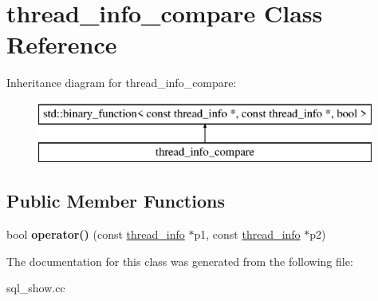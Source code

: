 \hypertarget{classthread__info__compare}{}\section{thread\+\_\+info\+\_\+compare Class Reference}
\label{classthread__info__compare}
Inheritance diagram for thread\+\_\+info\+\_\+compare\+:\begin{figure}[H]
\begin{center}
\leavevmode
\includegraphics[height=2.000000cm]{classthread__info__compare}
\end{center}
\end{figure}
\subsection*{Public Member Functions}
\begin{DoxyCompactItemize}
\item 
\mbox{\label{classthread__info__compare_a1df497e782b5825bb1a8cccdc1ac0b2a}} 
bool {\bfseries operator()} (const \mbox{\hyperlink{classthread__info}{thread\+\_\+info}} $\ast$p1, const \mbox{\hyperlink{classthread__info}{thread\+\_\+info}} $\ast$p2)
\end{DoxyCompactItemize}


The documentation for this class was generated from the following file\+:\begin{DoxyCompactItemize}
\item 
sql\+\_\+show.\+cc\end{DoxyCompactItemize}
